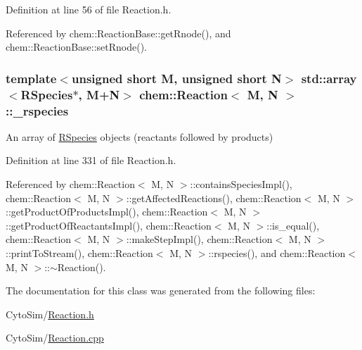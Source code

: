 Definition at line 56 of file Reaction.\-h.



Referenced by chem\-::\-Reaction\-Base\-::get\-Rnode(), and chem\-::\-Reaction\-Base\-::set\-Rnode().

\hypertarget{classchem_1_1Reaction_a42e73865e61bfb5b03a4639b571e5d72}{
\subsubsection[{\-\_\-rspecies}]{\setlength{\rightskip}{0pt plus 5cm}template$<$unsigned short M, unsigned short N$>$ std\-::array$<${\bf R\-Species}$\ast$, M+N$>$ {\bf chem\-::\-Reaction}$<$ M, N $>$\-::{\bf \-\_\-rspecies}}}\label{classchem_1_1Reaction_a42e73865e61bfb5b03a4639b571e5d72}


An array of \hyperlink{classchem_1_1RSpecies}{R\-Species} objects (reactants followed by products) 



Definition at line 331 of file Reaction.\-h.



Referenced by chem\-::\-Reaction$<$ M, N $>$\-::contains\-Species\-Impl(), chem\-::\-Reaction$<$ M, N $>$\-::get\-Affected\-Reactions(), chem\-::\-Reaction$<$ M, N $>$\-::get\-Product\-Of\-Products\-Impl(), chem\-::\-Reaction$<$ M, N $>$\-::get\-Product\-Of\-Reactants\-Impl(), chem\-::\-Reaction$<$ M, N $>$\-::is\-\_\-equal(), chem\-::\-Reaction$<$ M, N $>$\-::make\-Step\-Impl(), chem\-::\-Reaction$<$ M, N $>$\-::print\-To\-Stream(), chem\-::\-Reaction$<$ M, N $>$\-::rspecies(), and chem\-::\-Reaction$<$ M, N $>$\-::$\sim$\-Reaction().



The documentation for this class was generated from the following files\-:\begin{DoxyCompactItemize}
\item 
Cyto\-Sim/\hyperlink{Reaction_8h}{Reaction.\-h}\item 
Cyto\-Sim/\hyperlink{Reaction_8cpp}{Reaction.\-cpp}\end{DoxyCompactItemize}
